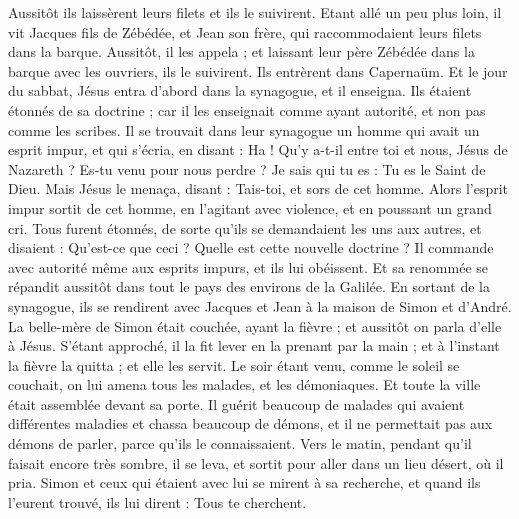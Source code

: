 \begin{multicols}{2}
Aussitôt ils laissèrent leurs filets et ils le suivirent.
Etant allé un peu plus loin, il vit Jacques fils de Zébédée, et Jean son frère, qui raccommodaient leurs filets dans la barque.
Aussitôt, il les appela ; et laissant leur père Zébédée dans la barque avec les ouvriers, ils le suivirent.
Ils entrèrent dans Capernaüm. Et le jour du sabbat, Jésus entra d’abord dans la synagogue, et il enseigna.
Ils étaient étonnés de sa doctrine ; car il les enseignait comme ayant autorité, et non pas comme les scribes.
Il se trouvait dans leur synagogue un homme qui avait un esprit impur, et qui s'écria,
en disant : Ha ! Qu’y a-t-il entre toi et nous, Jésus de Nazareth ? Es-tu venu pour nous perdre ? Je sais qui tu es : Tu es le Saint de Dieu.
Mais Jésus le menaça, disant : Tais-toi, et sors de cet homme.
Alors l'esprit impur sortit de cet homme, en l’agitant avec violence, et en poussant un grand cri.
Tous furent étonnés, de sorte qu'ils se demandaient les uns aux autres, et disaient : Qu'est-ce que ceci ? Quelle est cette nouvelle doctrine ? Il commande avec autorité même aux esprits impurs, et ils lui obéissent.
Et sa renommée se répandit aussitôt dans tout le pays des environs de la Galilée.
En sortant de la synagogue, ils se rendirent avec Jacques et Jean à la maison de Simon et d'André.
La belle-mère de Simon était couchée, ayant la fièvre ; et aussitôt on parla d’elle à Jésus.
S’étant approché, il la fit lever en la prenant par la main ; et à l'instant la fièvre la quitta ; et elle les servit.
Le soir étant venu, comme le soleil se couchait, on lui amena tous les malades, et les démoniaques.
Et toute la ville était assemblée devant sa porte.
Il guérit beaucoup de malades qui avaient différentes maladies et chassa beaucoup de démons, et il ne permettait pas aux démons de parler, parce qu’ils le connaissaient.
Vers le matin, pendant qu’il faisait encore très sombre, il se leva, et sortit pour aller dans un lieu désert, où il pria.
Simon et ceux qui étaient avec lui se mirent à sa recherche,
et quand ils l’eurent trouvé, ils lui dirent : Tous te cherchent.

\end{multicols}
